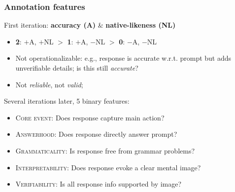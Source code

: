 \documentclass[handout,xcolor={dvipsnames}]{beamer}
\newcommand{\feat}[1]{\textsc{#1}}
\begin{document}
\begin{frame}
\frametitle{Annotation features}
\pause
First iteration: \textbf{accuracy (A)} \& \textbf{native-likeness (NL)}
\begin{itemize}
\pause
\item \textbf{2}: $+$A, $+$NL $>$ \textbf{1}: $+$A, $-$NL $>$ \textbf{0}: $-$A, $-$NL
\pause
\item Not operationalizable: e.g., response is accurate w.r.t. prompt but adds unverifiable details; is this still \textit{accurate}?
\item Not \textit{reliable}, not \textit{valid};
\end{itemize}
\pause
\vspace{.6em}
Several iterations later, 5 binary features:
\begin{itemize}
\pause
\item \feat{Core event}: \pause Does response capture main action?
\pause
\item \feat{Answerhood}: \pause Does response directly answer prompt?
\pause
\item \feat{Grammaticality}: \pause Is response free from grammar problems?
\pause
\item \feat{Interpretability}: \pause Does response evoke a clear mental image?
\pause
\item \feat{Verifiability}: \pause Is all response info supported by image?
\end{itemize}


\end{frame}
\end{document}
